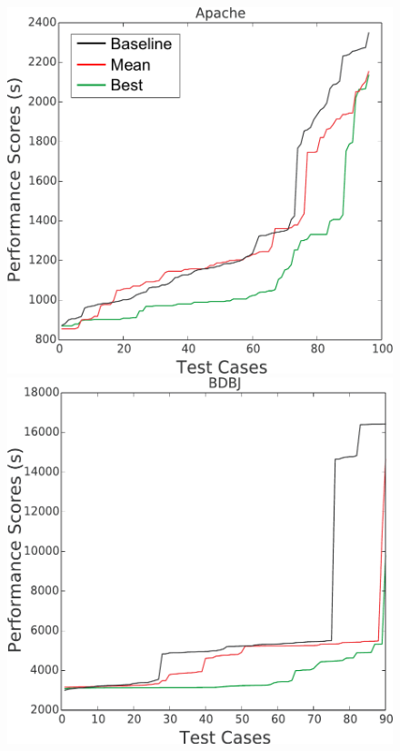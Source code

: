 \documentclass[conference]{IEEEtran}
\begin{document}
 \begin{figure}[htbp!]
\centering
\begin{minipage}{0.30\linewidth}
\includegraphics[width=\linewidth]{_figs/Apache.pdf}
\end{minipage}
\begin{minipage}{0.30\linewidth}
\includegraphics[width=\linewidth]{_figs/BDBJ.pdf}

\end{minipage}
\end{figure}
\end{document}
